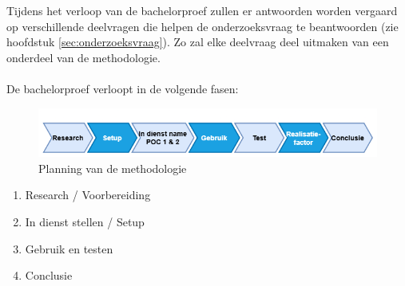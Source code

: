 
\chapter{}%
\label{ch:methodologie}

Tijdens het verloop van de bachelorproef zullen er antwoorden worden vergaard op verschillende deelvragen die helpen de onderzoeksvraag te beantwoorden (zie hoofdstuk \ref{sec:onderzoeksvraag}). Zo zal elke deelvraag deel uitmaken van een onderdeel van de methodologie.
\\\\
De bachelorproef verloopt in de volgende fasen:

\begin{figure}[h]
  \includegraphics[width=\linewidth]{../graphics/Planning.png}
  \caption{Planning van de methodologie}
  \label{fig:Planning}
\end{figure}

\begin{enumerate}
  \item Research / Voorbereiding
  \item In dienst stellen / Setup
  \item Gebruik en testen
  \item Conclusie
\end{enumerate}

